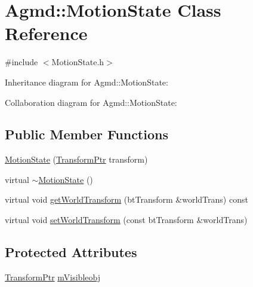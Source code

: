 \hypertarget{class_agmd_1_1_motion_state}{\section{Agmd\+:\+:Motion\+State Class Reference}
\label{class_agmd_1_1_motion_state}
}


{\ttfamily \#include $<$Motion\+State.\+h$>$}



Inheritance diagram for Agmd\+:\+:Motion\+State\+:


Collaboration diagram for Agmd\+:\+:Motion\+State\+:
\subsection*{Public Member Functions}
\begin{DoxyCompactItemize}
\item 
\hyperlink{class_agmd_1_1_motion_state_a8b067656f26e649636415a3ad21b1e76}{Motion\+State} (\hyperlink{namespace_agmd_maths_a5f0367fe1d910e5b7bf2f4b657f33aff}{Transform\+Ptr} transform)
\item 
virtual \hyperlink{class_agmd_1_1_motion_state_a50afd3b1e0e1b131b40b98c9764ceea2}{$\sim$\+Motion\+State} ()
\item 
virtual void \hyperlink{class_agmd_1_1_motion_state_abdf5479ae41c0c9e732a16636209b8f2}{get\+World\+Transform} (bt\+Transform \&world\+Trans) const 
\item 
virtual void \hyperlink{class_agmd_1_1_motion_state_a605ea9f313e620892eda9719ed0562d3}{set\+World\+Transform} (const bt\+Transform \&world\+Trans)
\end{DoxyCompactItemize}
\subsection*{Protected Attributes}
\begin{DoxyCompactItemize}
\item 
\hyperlink{namespace_agmd_maths_a5f0367fe1d910e5b7bf2f4b657f33aff}{Transform\+Ptr} \hyperlink{class_agmd_1_1_motion_state_aafba23c4907296b7f23a45c93d452665}{m\+Visibleobj}
\end{DoxyCompactItemize}


